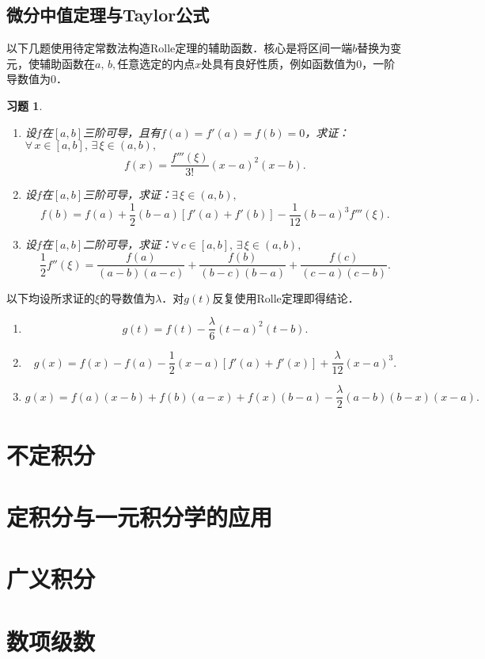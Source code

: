 \documentclass[11pt,a4paper]{ctexart}
\makeatletter
\theoremstyle{thmseries} %
\theoremstyle{exerseries}
\newtheorem{exer}{习题}[section]
\renewenvironment{proof}[1][\proofname]{\par
  \pushQED{\qed}%
  \normalfont \topsep6\p@\@plus6\p@\relax
  \trivlist
  \item[\hskip\labelsep
        \itshape
    #1\@addpunct{}]\ignorespaces
}{%
  \popQED\endtrivlist\@endpefalse
}
\newenvironment{pf}{\begin{proof}[\bfseries\upshape 证\quad]}{\end{proof}}
\newcommand{\sbra}[1]{\mathopen{}\left[#1\right]}
\makeatother
\begin{document}
\subsection{微分中值定理与Taylor公式}
以下几题使用待定常数法构造Rolle定理的辅助函数．核心是将区间一端$b$替换为变元，使辅助函数在$a,\,b,$任意选定的内点$x$处具有良好性质，例如函数值为0，一阶导数值为0．
\begin{exer}
	\phantom{linebreak}
	\begin{enumerate}
		\item 设$f$在$[a,b]$三阶可导，且有$f(a)=f'(a)=f(b)=0$，求证：$\forall\,x\in[a,b],\,\exists\,\xi\in(a,b),$
		\[f(x)=\frac{f'''(\xi)}{3!}(x-a)^2(x-b).\]
		\item 设$f$在$[a,b]$三阶可导，求证：$\exists\,\xi\in(a,b),$
		\[f(b)=f(a)+\frac{1}{2}(b-a)[f'(a)+f'(b)]-\frac{1}{12}(b-a)^3f'''(\xi).\]
		\item 设$f$在$[a,b]$二阶可导，求证：$\forall\,c\in[a,b],\,\exists\,\xi\in(a,b),$
		\[\frac{1}{2}f''(\xi)=\frac{f(a)}{(a-b)(a-c)}+\frac{f(b)}{(b-c)(b-a)}+\frac{f(c)}{(c-a)(c-b)}.\]
	\end{enumerate}
\end{exer}
\begin{pf}
	以下均设所求证的$\xi$的导数值为$\lambda$．对$g(t)$反复使用Rolle定理即得结论．
	\begin{enumerate}
		\item \[g(t)=f(t)-\frac{\lambda}{6}(t-a)^2(t-b).\]
		\item \[g(x)=f(x)-f(a)-\frac{1}{2}(x-a)\sbra{f'(a)+f'(x)}+\frac{\lambda}{12}(x-a)^3.\]
		\item \[g(x)=f(a)(x-b)+f(b)(a-x)+f(x)(b-a)-\frac{\lambda}{2}(a-b)(b-x)(x-a).\]
	\end{enumerate}
\end{pf}


\section{不定积分}


\section{定积分与一元积分学的应用}


\section{广义积分}


\section{数项级数}
\end{document}

